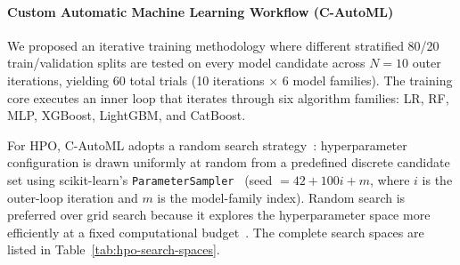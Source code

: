 \documentclass[diagnostics,article,accept,pdftex,moreauthors]{Definitions/mdpi}
\begin{document}
\paragraph{{Custom Automatic Machine Learning Workflow (C-AutoML)}} %
We proposed an iterative training methodology where different stratified
80/20 train/validation splits are tested on every model candidate
across $N = 10$ outer iterations, yielding 60 total trials
(10 iterations $\times$ 6 model families). The training core executes
an inner loop that iterates through six algorithm families: \ac{LR},
\ac{RF}, \ac{MLP}, XGBoost, LightGBM, and CatBoost.

For \ac{HPO}, C-AutoML adopts a {random search}
strategy~\cite{bergstra2012random}: %
hyperparameter configuration is drawn uniformly at random from a
predefined discrete candidate set using scikit-learn's
\texttt{ParameterSampler}~\cite{sklearn-api} (seed $= 42 + 100i + m$,
where $i$ is the outer-loop iteration and $m$ is the model-family
index). Random search is preferred over grid search because it
explores the hyperparameter space more efficiently at a fixed
computational budget~\cite{bergstra2012random}. The complete search
spaces are listed in Table~\ref{tab:hpo-search-spaces}.
\end{document}
